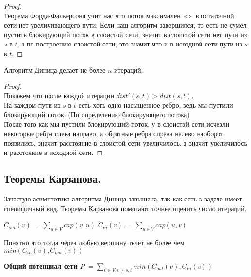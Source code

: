 \begin{proof} \ \\
	Теорема Форда-Фалкерсона учит нас что поток максимален $\iff$ в остаточной сети нет увеличивающего пути. Если наш алгоритм завершился, то есть не сумел пустить блокирующий поток в слоистой сети, значит в слоистой сети нет пути из $s$ в  $t$, а по построению слоистой сети, это значит что и в исходной сети пути из $s$ в  $t$.
\end{proof}

\begin{prop}
	Алгоритм Диница делает не более $n$	итераций.
\end{prop}

\begin{proof} \ \\
	Покажем что после каждой итерации $dist'(s, t) > dist(s, t)$. \\
	На каждом пути из $s$ в  $t$ есть хоть одно насыщенное ребро, ведь мы пустили блокирующий поток. (По определению блокирующего потока) \\
	После того как мы пустили блокирующий поток, у в слоистой сети исчезли некоторые ребра слева направо, а обратные ребра справа налево наоборот появились, значит расстояние в слоистой сети увеличилось, а значит увеличилось и расстояние в исходной сети.
\end{proof}


\subsection{Теоремы Карзанова.}%
\label{sub:Теоремы Карзанова.}

Зачастую асимптотика алгоритма Диница завышена, так как сеть в задаче имеет специфичный вид. Теоремы Карзанова помогают точнее оценить число итераций.

\begin{Def}
	\textbf{$C_{out}(v)$} $= \sum\limits_{u \in V} cap(v, u)$
	\textbf{$C_{in}(v)$} $= \sum\limits_{u \in V} cap(u, v)$
\end{Def}

\begin{note}
	Понятно что тогда через любую вершину течет не более чем $min(C_{in}(v), C_{out}(v))$
\end{note}

\begin{Def}
	\textbf{Общий потенциал сети $P$} $= \sum\limits_{v \in V, v \neq s, t} min(C_{out}(v), C_{in}(v))$
\end{Def}


